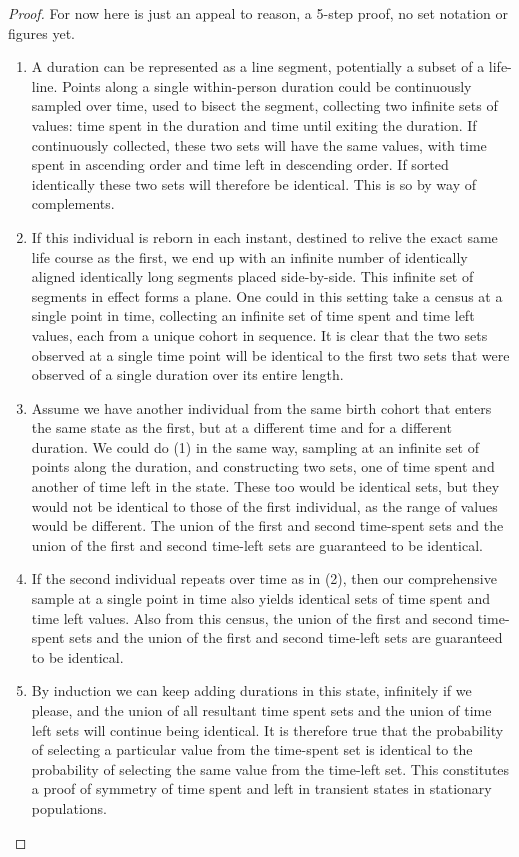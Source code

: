 \documentclass[12pt,oneside,a4paper]{article} %
\theoremstyle{definition}
\begin{document}
\begin{proof}
For now here is just an appeal to reason, a 5-step proof, no set notation or
figures yet.
\begin{enumerate}
\item{} A duration can be represented as a line segment, potentially a
subset of a life-line. Points along a single within-person duration could be continuously
sampled over time, used to bisect the segment, collecting two infinite sets of
values: time spent in the duration and time until exiting the duration. If
continuously collected, these two sets will have the same values, with time
spent in ascending order and time left in descending order. If sorted
identically these two sets will therefore be identical. This is so by way of
complements.

\item{} If this individual is reborn in each instant, destined to relive the
exact same life course as the first, we end up with an infinite
number of identically aligned identically long segments placed side-by-side.
This infinite set of segments in effect forms a plane. One could in this
setting take a census at a single point in time, collecting an infinite set of
time spent and time left values, each from a unique cohort in sequence. It is
clear that the two sets observed at a single time point will be identical
to the first two sets that were observed of a single duration over its entire
length.

\item{} Assume we have another individual from the same birth cohort that enters
the same state as the first, but at a different time and for a different
duration. We could do (1) in the same way, sampling at an infinite set of points
along the duration, and constructing two sets, one of time spent and another of
time left in the state. These too would be identical sets, but they would not be
identical to those of the first individual, as the range of values would be
different. The union of the first and second time-spent sets and the union of
the first and second time-left sets are guaranteed to be identical. 

\item{} If the second individual repeats over time as in (2), then our
comprehensive sample at a single point in time also yields identical sets
of time spent and time left values. Also from this census, the union of the
first and second time-spent sets and the union of the first and second time-left sets
are guaranteed to be identical. 

\item{} By induction we can keep adding durations in this state, infinitely if we
please, and the union of all resultant time spent sets and the union of time
left sets will continue being identical. It is therefore true that the
probability of selecting a particular value from the time-spent set is identical
to the probability of selecting the same value from the time-left set. This
constitutes a proof of symmetry of time spent and left in transient states in
stationary populations.
\end{enumerate}
\end{proof}
\end{document}

